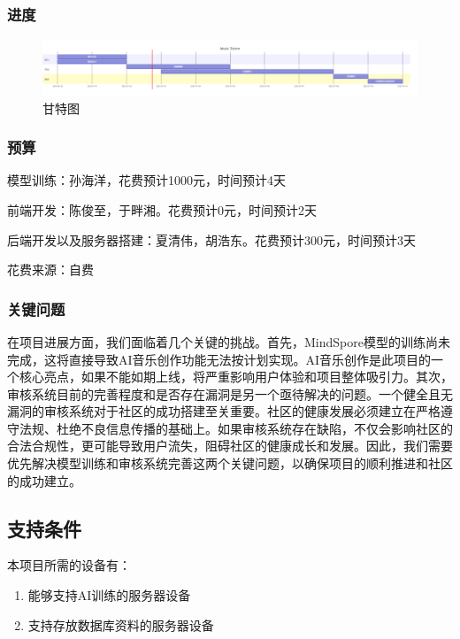 \documentclass{base}
\begin{document}
\subsubsection{进度}

\begin{figure}[H]
    \centering
    \includegraphics[width=\textwidth]{images/3-1.png}
    \caption{甘特图}
    \label{fig:gantt-chart}
\end{figure}

\subsubsection{预算}

模型训练：孙海洋，花费预计1000元，时间预计4天

前端开发：陈俊至，于畔湘。花费预计0元，时间预计2天

后端开发以及服务器搭建：夏清伟，胡浩东。花费预计300元，时间预计3天

花费来源：自费

\subsubsection{关键问题}

在项目进展方面，我们面临着几个关键的挑战。首先，MindSpore模型的训练尚未完成，这将直接导致AI音乐创作功能无法按计划实现。AI音乐创作是此项目的一个核心亮点，如果不能如期上线，将严重影响用户体验和项目整体吸引力。其次，审核系统目前的完善程度和是否存在漏洞是另一个亟待解决的问题。一个健全且无漏洞的审核系统对于社区的成功搭建至关重要。社区的健康发展必须建立在严格遵守法规、杜绝不良信息传播的基础上。如果审核系统存在缺陷，不仅会影响社区的合法合规性，更可能导致用户流失，阻碍社区的健康成长和发展。因此，我们需要优先解决模型训练和审核系统完善这两个关键问题，以确保项目的顺利推进和社区的成功建立。

\subsection{支持条件}

本项目所需的设备有：

\begin{enumerate}
    \item 能够支持AI训练的服务器设备
    \item 支持存放数据库资料的服务器设备
\end{enumerate}
\end{document}
